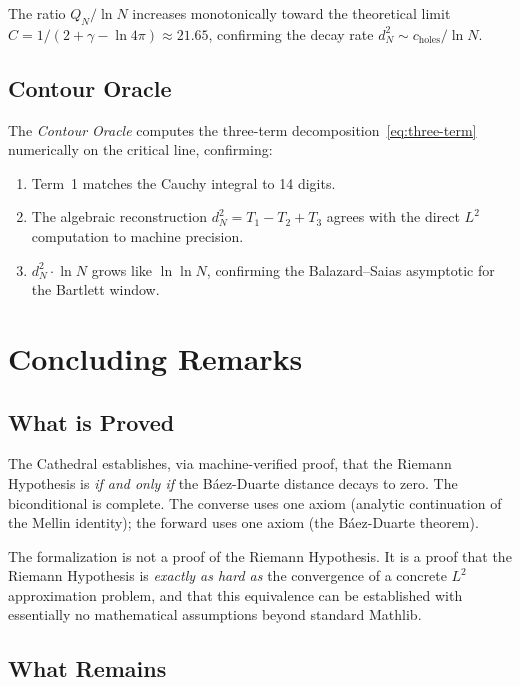 \documentclass[11pt,a4paper]{article}
\theoremstyle{plain}
\theoremstyle{definition}
\theoremstyle{remark}
\begin{document}
The ratio $Q_N / \ln N$ increases monotonically toward the theoretical
limit $C = 1/(2 + \gamma - \ln 4\pi) \approx 21.65$, confirming
the decay rate $d_N^2 \sim c_{\text{holes}} / \ln N$.

\subsection{Contour Oracle}

The \emph{Contour Oracle} computes the three-term
decomposition~\eqref{eq:three-term} numerically on the critical line,
confirming:
\begin{enumerate}
  \item Term~1 matches the Cauchy integral to 14 digits.
  \item The algebraic reconstruction $d_N^2 = T_1 - T_2 + T_3$ agrees
    with the direct $L^2$ computation to machine precision.
  \item $d_N^2 \cdot \ln N$ grows like $\ln\ln N$, confirming the
    Balazard--Saias asymptotic for the Bartlett window.
\end{enumerate}

\section{Concluding Remarks}

\subsection{What is Proved}

The Cathedral establishes, via machine-verified proof, that the Riemann
Hypothesis is \emph{if and only if} the B\'aez-Duarte distance decays
to zero. The biconditional is complete. The converse uses one axiom
(analytic continuation of the Mellin identity); the forward uses one
axiom (the B\'aez-Duarte theorem).

The formalization is not a proof of the Riemann Hypothesis. It is
a proof that the Riemann Hypothesis is \emph{exactly as hard as}
the convergence of a concrete $L^2$ approximation problem, and
that this equivalence can be established with essentially no
mathematical assumptions beyond standard Mathlib.

\subsection{What Remains}
\end{document}
